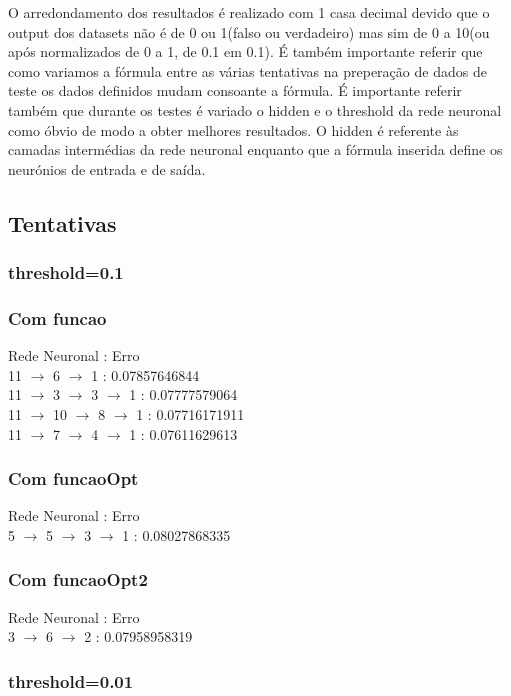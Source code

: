 \documentclass{article}
\begin{document}
O arredondamento dos resultados é realizado com 1 casa decimal devido que o output dos datasets não é de 0 ou 1(falso ou verdadeiro) mas sim de 0 a 10(ou após normalizados de 0 a 1, de 0.1 em 0.1).
É também importante referir que como variamos a fórmula entre as várias tentativas na preperação de dados de teste os dados definidos mudam consoante a fórmula. É importante referir também que durante os testes é variado o hidden e o threshold da rede neuronal como óbvio de modo a obter melhores resultados.
O hidden é referente às camadas intermédias da rede neuronal enquanto que a fórmula inserida define os neurónios de entrada e de saída.

\subsection{Tentativas}

\subsubsection{threshold=0.1}
\subsubsection{Com funcao}
Rede Neuronal : Erro\\
11 $\to$ 6 $\to$ 1 : 0.07857646844\\
11 $\to$ 3 $\to$ 3 $\to$ 1 : 0.07777579064\\
11 $\to$ 10 $\to$ 8 $\to$ 1 : 0.07716171911\\
11 $\to$ 7 $\to$ 4 $\to$ 1 : 0.07611629613\\

\subsubsection{Com funcaoOpt}
Rede Neuronal : Erro\\
5 $\to$ 5 $\to$ 3 $\to$ 1 : 0.08027868335\\

\subsubsection{Com funcaoOpt2}
Rede Neuronal : Erro\\
3 $\to$ 6 $\to$ 2 : 0.07958958319\\

\subsubsection{threshold=0.01}
\end{document}
